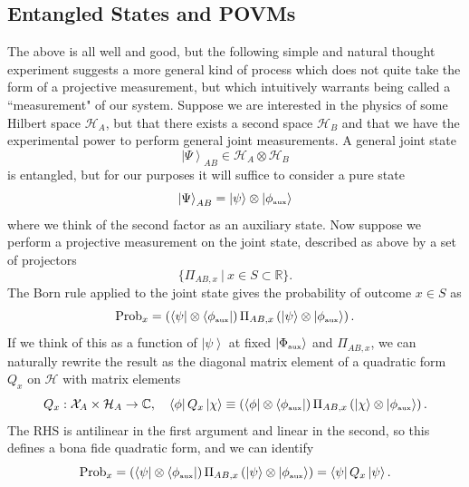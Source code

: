 \documentclass[11pt,letterpaper]{article}
\newcommand{\LP}{\left(}
\newcommand{\RP}{\right)}
\newcommand{\mc}[1]{\mathcal{#1}}
\newcommand{\R}{\mathbb{R}}
\newcommand{\C}{\mathbb{C}}
\newcommand{\KET}[1]{\left| #1 \right\rangle }
\newcommand{\BRA}[1]{\left\langle #1 \right| }
\begin{document}
\subsection{Entangled States and POVMs}
The above is all well and good, but the following simple and natural thought experiment suggests a more general kind of process which does not quite take the form of a projective measurement, but which intuitively warrants being called a ``measurement" of our system. Suppose we are interested in the physics of some Hilbert space $\mc{H}_A$, but that there exists a second space $\mc{H}_B$ and that we have the experimental power to perform general joint measurements. A general joint state \begin{equation}
\KET{\Psi}_{AB} \in \mc{H}_A \otimes \mc{H}_B
\end{equation}
is entangled, but for our purposes it will suffice to consider a pure state \begin{equation}
\KET{\Psi}_{AB} = \KET{\psi} \otimes \KET{\phi_{\mbox{\tiny{aux}}}}
\end{equation}
where we think of the second factor as an auxiliary state. Now suppose we perform a projective measurement on the joint state, described as above by a set of projectors \begin{equation}
\{ \Pi_{AB,x} \ | \ x \in S \subset \R\}.
\end{equation}
The Born rule applied to the joint state gives the probability of outcome $x \in S$ as \begin{equation}
\mbox{Prob}_x = \LP \BRA{\psi} \otimes \BRA{\phi_{\mbox{\tiny{aux}}}} \RP  \Pi_{AB,x} \LP \KET{\psi} \otimes \KET{\phi_{\mbox{\tiny{aux}}}} \RP.
\end{equation}
If we think of this as a function of $\KET{\psi}$ at fixed $\KET{\Phi_{\mbox{\tiny{aux}}}}$ and $\Pi_{AB,x}$, we can naturally rewrite the result as the diagonal matrix element of a quadratic form $Q_x$ on $\mc{H}$ with matrix elements \begin{equation}
Q_x: \mc{X}_A \times \mc{H}_A \to \C, \quad \BRA{\phi} Q_x \KET{\chi} \equiv \LP \BRA{\phi} \otimes \BRA{\phi_{\mbox{\tiny{aux}}}} \RP  \Pi_{AB,x} \LP \KET{\chi} \otimes \KET{\phi_{\mbox{\tiny{aux}}}} \RP.
\end{equation}
The RHS is antilinear in the first argument and linear in the second, so this defines a bona fide quadratic form, and we can identify \begin{equation}
\mbox{Prob}_x = \LP \BRA{\psi} \otimes \BRA{\phi_{\mbox{\tiny{aux}}}} \RP  \Pi_{AB,x} \LP \KET{\psi} \otimes \KET{\phi_{\mbox{\tiny{aux}}}} \RP = \BRA{\psi} Q_x \KET{\psi}.
\end{equation}
\end{document}
